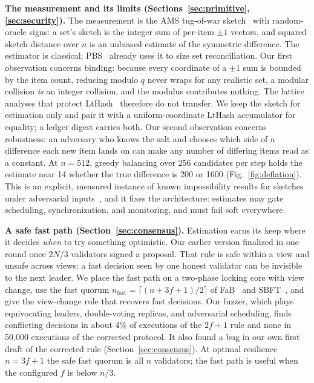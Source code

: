 \documentclass[journal]{IEEEtran}
\newcommand{\nf}{\ensuremath{n_{\mathrm{fast}}}}
\begin{document}
\textbf{The measurement and its limits (Sections~\ref{sec:primitive},
\ref{sec:security}).} The measurement is the AMS tug-of-war
sketch~\cite{ams1996} with random-oracle signs: a set's sketch is the
integer sum of per-item $\pm 1$ vectors, and squared sketch distance over
$n$ is an unbiased estimate of the symmetric difference. The estimator is
classical; PBS~\cite{gong2020pbs} already uses it to size set
reconciliation. Our first observation concerns binding: because every
coordinate of a $\pm 1$ sum is bounded by the item count, reducing modulo
$q$ never wraps for any realistic set, a modular collision \emph{is} an
integer collision, and the modulus contributes nothing. The lattice
analyses that protect LtHash~\cite{lewi2019lthash} therefore do not
transfer. We keep the sketch for estimation only and pair it with a
uniform-coordinate LtHash accumulator for equality; a ledger digest
carries both. Our second observation concerns robustness: an adversary
who knows the salt and chooses which side of a difference each new item
lands on can make any number of differing items read as a constant. At
$n = 512$, greedy balancing over 256 candidates per step holds the
estimate near 14 whether the true difference is 200 or 1600
(Fig.~\ref{fig:deflation}). This is an explicit, measured instance of
known impossibility results for sketches under adversarial
inputs~\cite{mironov2011sketching,ajtai2022whitebox,hardt2013robust}, and
it fixes the architecture: estimates may gate scheduling,
synchronization, and monitoring, and must fail soft everywhere.

\textbf{A safe fast path (Section~\ref{sec:consensus}).} Estimation
earns its keep where it decides \emph{when} to try something optimistic.
Our earlier version finalized in one round once $2N/3$ validators signed
a proposal. That rule is safe within a view and unsafe across views: a
fast decision seen by one honest validator can be invisible to the next
leader. We place the fast path on a two-phase locking core with view
change, use the fast quorum $\nf = \lceil (n + 3f + 1)/2 \rceil$ of
FaB~\cite{martin2006fab} and SBFT~\cite{gueta2019sbft}, and give the
view-change rule that recovers fast decisions. Our fuzzer, which plays
equivocating leaders, double-voting replicas, and adversarial
scheduling, finds conflicting decisions in about 4\% of executions of
the $2f+1$ rule and none in 50,000 executions of the corrected protocol.
It also found a bug in our own first draft of the corrected rule
(Section~\ref{sec:consensus}). At optimal resilience $n = 3f + 1$ the
safe fast quorum is all $n$ validators; the fast path is useful when the
configured $f$ is below $n/3$.
\end{document}
